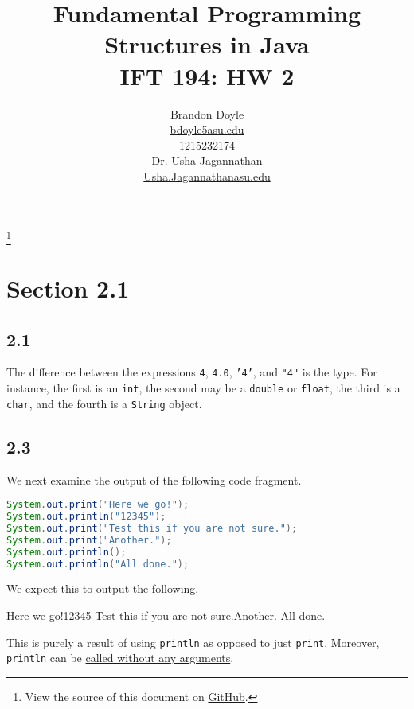 \documentclass[leqno, 11pt]{article}
\title{\vspace{6ex}Fundamental Programming Structures in Java\\
  \Large IFT 194: HW 2}
\author{Brandon Doyle\\
\href{mailto:bdoyle@asu.edu}{bdoyle5\at{}asu.edu}\\
1215232174\\[1em]
Dr. Usha Jagannathan\\
\href{mailto:Usha.Jagannathan@asu.edu}{Usha.Jagannathan\at{}asu.edu}}
\newcommand\blfootnote[1]{%
  \begingroup
    \renewcommand\thefootnote{}\footnote{#1}
    \addtocounter{footnote}{-1}
  \endgroup
}
\begin{document}
\begin{titlepage}
\clearpage\maketitle
\thispagestyle{empty}
\end{titlepage}
\blfootnote{View the source of this document on \href{https://github.com/bjd2385/IFT_194_labs/blob/master/\jobname.tex}{GitHub}.}
\section*{Section 2.1}
\subsection*{2.1}
The difference between the expressions \texttt{4}, \texttt{4.0}, \texttt{'4'}, and \texttt{"4"} is the type. For instance, the first is an \texttt{int}, the second may be a \texttt{double} or \texttt{float}, the third is a \texttt{char}, and the fourth is a \texttt{String} object.
\subsection*{2.3}
We next examine the output of the following code fragment.
\begin{lstlisting}[language=java, xleftmargin=0.3\textwidth]
System.out.print("Here we go!");
System.out.println("12345");
System.out.print("Test this if you are not sure.");
System.out.print("Another.");
System.out.println();
System.out.println("All done.");
\end{lstlisting}
We expect this to output the following.
\begin{verbbox}
Here we go!12345
Test this if you are not sure.Another.
All done.
\end{verbbox}
\begin{center}
\theverbbox
\end{center}
This is purely a result of using \texttt{println} as opposed to just \texttt{print}. Moreover, \texttt{println} can be \href{https://docs.oracle.com/javase/10/docs/api/java/io/PrintStream.html#println()}{called without any arguments}.
\end{document}
